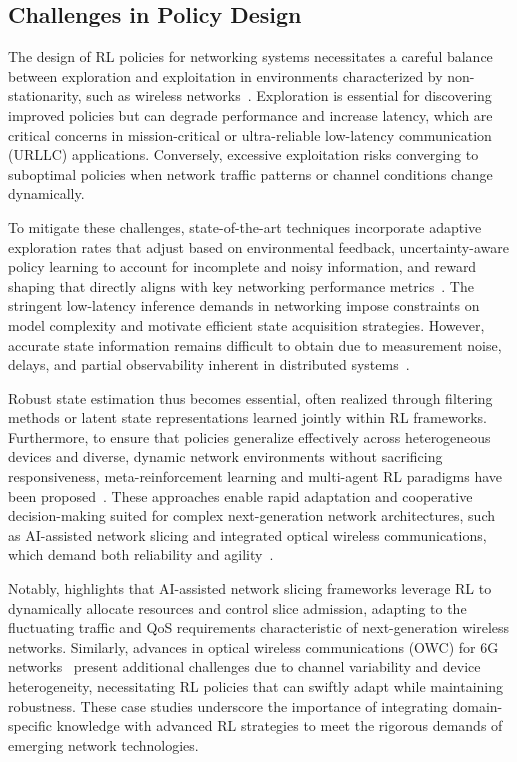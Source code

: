 \documentclass[sigconf]{acmart}
\begin{document}
\subsection{Challenges in Policy Design}

The design of RL policies for networking systems necessitates a careful balance between exploration and exploitation in environments characterized by non-stationarity, such as wireless networks~\cite{ref3,ref6,ref14,ref48}. Exploration is essential for discovering improved policies but can degrade performance and increase latency, which are critical concerns in mission-critical or ultra-reliable low-latency communication (URLLC) applications. Conversely, excessive exploitation risks converging to suboptimal policies when network traffic patterns or channel conditions change dynamically.

To mitigate these challenges, state-of-the-art techniques incorporate adaptive exploration rates that adjust based on environmental feedback, uncertainty-aware policy learning to account for incomplete and noisy information, and reward shaping that directly aligns with key networking performance metrics~\cite{ref3,ref6}. The stringent low-latency inference demands in networking impose constraints on model complexity and motivate efficient state acquisition strategies. However, accurate state information remains difficult to obtain due to measurement noise, delays, and partial observability inherent in distributed systems~\cite{ref3,ref48}.

Robust state estimation thus becomes essential, often realized through filtering methods or latent state representations learned jointly within RL frameworks. Furthermore, to ensure that policies generalize effectively across heterogeneous devices and diverse, dynamic network environments without sacrificing responsiveness, meta-reinforcement learning and multi-agent RL paradigms have been proposed~\cite{ref14,ref6}. These approaches enable rapid adaptation and cooperative decision-making suited for complex next-generation network architectures, such as AI-assisted network slicing and integrated optical wireless communications, which demand both reliability and agility~\cite{ref6,ref14}.

Notably, \cite{ref6} highlights that AI-assisted network slicing frameworks leverage RL to dynamically allocate resources and control slice admission, adapting to the fluctuating traffic and QoS requirements characteristic of next-generation wireless networks. Similarly, advances in optical wireless communications (OWC) for 6G networks~\cite{ref14} present additional challenges due to channel variability and device heterogeneity, necessitating RL policies that can swiftly adapt while maintaining robustness. These case studies underscore the importance of integrating domain-specific knowledge with advanced RL strategies to meet the rigorous demands of emerging network technologies.
\end{document}
